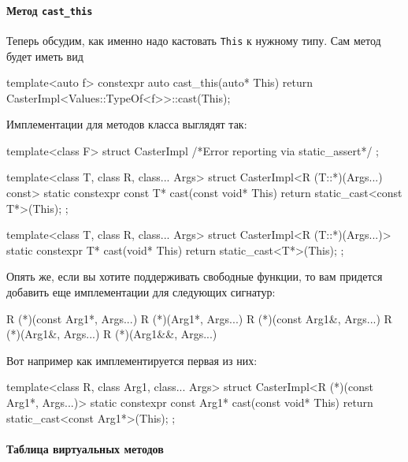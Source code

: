 \paragraph{Метод \texttt{cast\_this}}

Теперь обсудим, как именно надо кастовать \verb"This" к нужному типу.
Сам метод будет иметь вид
\begin{cppcode}
template<auto f>
constexpr auto cast_this(auto* This) {
  return CasterImpl<Values::TypeOf<f>>::cast(This);
}
\end{cppcode}
Имплементации для методов класса выглядят так:
\begin{cppcode}
template<class F>
struct CasterImpl { /*Error reporting via static_assert*/ };

template<class T, class R, class... Args>
struct CasterImpl<R (T::*)(Args...) const> {
  static constexpr const T* cast(const void* This) {
    return static_cast<const T*>(This);
  }
};

template<class T, class R, class... Args>
struct CasterImpl<R (T::*)(Args...)> {
  static constexpr T* cast(void* This) {
    return static_cast<T*>(This);
  }
};
\end{cppcode}
Опять же, если вы хотите поддерживать свободные функции, то вам придется добавить еще имплементации для следующих сигнатур:
\begin{cppcode}
R (*)(const Arg1*, Args...)
R (*)(Arg1*, Args...)
R (*)(const Arg1&, Args...)
R (*)(Arg1&, Args...)
R (*)(Arg1&&, Args...)
\end{cppcode}
Вот например как имплементируется первая из них:
\begin{cppcode}
template<class R, class Arg1, class... Args>
struct CasterImpl<R (*)(const Arg1*, Args...)> {
  static constexpr const Arg1* cast(const void* This) {
    return static_cast<const Arg1*>(This);
  }
};
\end{cppcode}

\paragraph{Таблица виртуальных методов}

